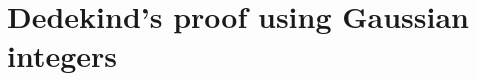 \documentclass{beamer}
\begin{document}
%

\section{Dedekind's proof using Gaussian integers}
\end{document}
